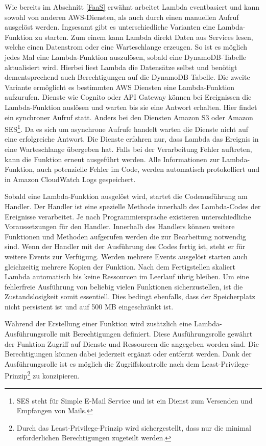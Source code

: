 {Wie bereits im Abschnitt \frqq \ref{FaaS}  \flqq{} erwähnt arbeitet Lambda eventbasiert und kann sowohl von anderen AWS-Diensten, als auch durch einen manuellen Aufruf ausgelöst werden.
Ingsesamt gibt es unterschiedliche Varianten eine Lambda-Funktion zu starten.
Zum einem kann Lambda direkt Daten aus Services lesen, welche einen Datenstrom oder eine Warteschlange erzeugen.
So ist es möglich jedes Mal eine Lambda-Funktion auszulösen, sobald eine DynamoDB-Tabelle aktualisiert wird.
Hierbei liest Lambda die Datensätze selbst und benötigt dementsprechend auch Berechtigungen auf die DynamoDB-Tabelle.\cite[]{LambdaDynamo}
Die zweite Variante ermöglicht es bestimmten AWS Diensten eine Lambda-Funktion aufzurufen.
Dienste wie Cognito oder API Gateway können bei Ereignissen die Lambda-Funktion auslösen und warten bis sie eine Antwort erhalten.
Hier findet ein synchroner Aufruf statt.
Anders bei den Diensten Amazon S3 oder Amazon SES\footnote{SES steht für Simple E-Mail Service und ist ein Dienst zum Versenden und Empfangen von Mails.}. Da es sich um asynchrone Aufrufe handelt warten die Dienste nicht auf eine erfolgreiche Antwort.
Die Dienste erfahren nur, dass Lambda das Ereignis in eine Warteschlange übergeben hat.
Falls bei der Verarbeitung Fehler auftreten, kann die Funktion erneut ausgeführt werden.
Alle Informationen zur Lambda-Funktion, auch potenzielle Fehler im Code, werden automatisch protokolliert und in Amazon CloudWatch Logs gespeichert.
\cite[]{LambdaDienste}

Sobald eine Lambda-Funktion ausgelöst wird, startet die Codeausführung am Handler.
Der Handler ist eine spezielle Methode innerhalb des Lambda-Codes der Ereignisse verarbeitet.
Je nach Programmiersprache existieren unterschiedliche Voraussetzungen für den Handler.
Innerhalb des Handlers können weitere Funktionen und Methoden aufgerufen werden die zur Bearbeitung notwendig sind.
Wenn der Handler mit der Ausführung des Codes fertig ist, steht er für weitere Events zur Verfügung.
Werden mehrere Events ausgelöst starten auch gleichzeitig mehrere Kopien der Funktion.
Nach dem Fertigstellen skaliert Lambda automatisch bis keine Ressourcen im Leerlauf übrig bleiben.
Um eine fehlerfreie Ausführung von beliebig vielen Funktionen sicherzustellen, ist die Zustandslosigkeit somit essentiell.
Dies bedingt ebenfalls, dass der Speicherplatz nicht persistent ist und auf 500 MB eingeschränkt ist.\cite[Seitenzahl 5-7]{AWSWhitepaper}

Während der Erstellung einer Funktion wird zusätzlich eine Lambda-Ausführungsrolle mit Berechtigungen definiert.
Diese Ausführungsrolle gewährt der Funktion Zugriff auf Dienste und Ressourcen die angegeben worden sind.
Die Berechtigungen können dabei jederzeit ergänzt oder entfernt werden.
Dank der Ausführungsrolle ist es möglich die Zugriffskontrolle nach dem Least-Privilege-Prinzip\footnote{Durch das Least-Privilege-Prinzip wird sichergestellt, dass nur die minimal erforderlichen Berechtigungen zugeteilt werden. } zu konzipieren.

}
